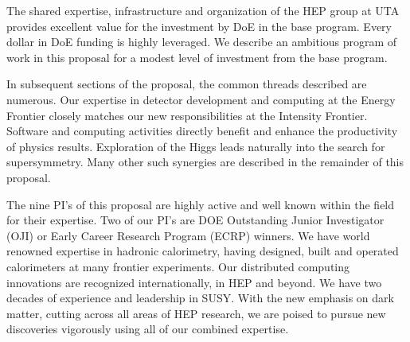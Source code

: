 The shared expertise, infrastructure and organization of the HEP group at UTA provides excellent value for the investment by DoE in the base program. Every dollar in DoE funding is highly leveraged. We describe an ambitious program of work in this proposal for a modest level of investment from the base program.

In subsequent sections of the proposal, the common threads described are numerous. Our expertise in detector development and computing at the Energy Frontier closely matches our new responsibilities at the Intensity Frontier. Software and computing activities directly benefit and enhance the productivity of physics results. Exploration of the Higgs leads naturally into the search for supersymmetry. Many other such synergies are described in the remainder of this proposal.

The nine PI's of this proposal are highly active and well known within the field for their expertise. Two of our PI's are DOE Outstanding Junior Investigator (OJI) or Early Career Research Program (ECRP) winners. We have world renowned expertise in hadronic calorimetry, having designed, built and operated calorimeters at many frontier experiments. Our distributed computing innovations are recognized internationally, in HEP and beyond. We have two decades of experience and leadership in SUSY. With the new emphasis on dark matter, cutting across all areas of HEP research, we are poised to pursue new discoveries vigorously using all of our combined expertise.
